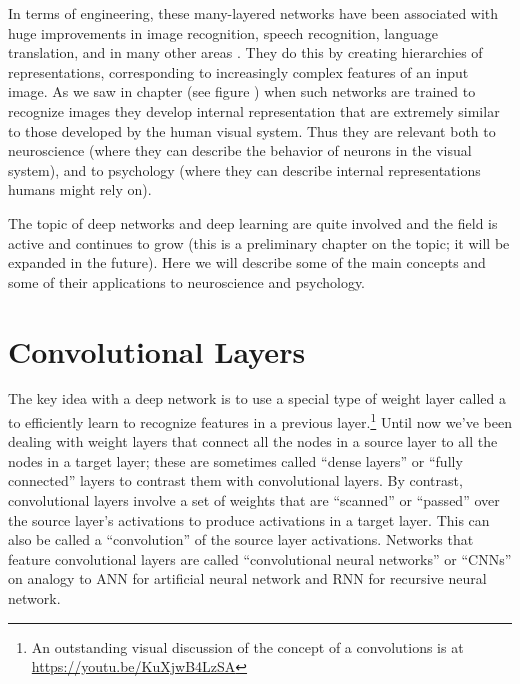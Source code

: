 In terms of engineering, these many-layered networks have been associated with huge improvements in image recognition, speech recognition, language translation, and in many other areas \cite{lecun2015deep, goodfellow2016deep}. They do this by creating hierarchies of representations, corresponding  to increasingly complex features of an input image. As we saw in chapter  (see figure ) when such networks are trained to recognize images they develop internal representation that are extremely similar to those developed by the human visual  system. Thus they are relevant both to neuroscience (where they can describe the behavior of neurons in the visual system), and to psychology (where they can describe internal representations humans might rely on).

The topic of deep networks and deep learning are quite involved and the field is active and continues to grow (this is a preliminary chapter on the topic; it will be expanded in the future). Here we will describe some of the main concepts and some of their applications to neuroscience and psychology.

\section{Convolutional Layers}\label{convolutionalLayer}


The key idea with a deep network is to use a special type of weight layer called a  to efficiently learn to recognize features in a previous layer.\footnote{An outstanding visual discussion of the concept of a convolutions is at \url{https://youtu.be/KuXjwB4LzSA}} Until now we've been dealing with weight layers that connect all the nodes in a source layer to all the nodes in a target layer; these are sometimes called ``dense layers'' or ``fully connected'' layers to contrast them with convolutional layers. By contrast, convolutional layers involve a set of weights that are ``scanned'' or ``passed'' over the source layer's activations to produce activations in a target layer. This can also be called a ``convolution'' of the source layer activations. Networks that feature convolutional layers are called ``convolutional neural networks'' or ``CNNs'' on analogy to ANN for artificial neural network and RNN for recursive neural network.

